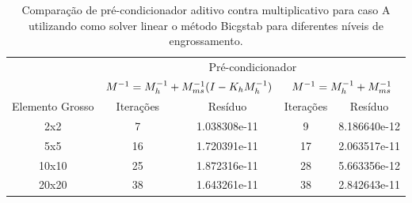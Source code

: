 \begin{table}[]
    \caption{Comparação de pré-condicionador aditivo contra multiplicativo para caso A utilizando como solver linear o método Bicgstab para diferentes níveis de engrossamento.}
    \label{table:precondcasoAcomp}
    \begin{tabular}{c|c|c|c|l|}

    \cline{2-5}
                                          & \multicolumn{4}{c|}{Pré-condicionador}                                                        \\ \cline{2-5} 
                                          & \multicolumn{2}{c|}{$M^{-1}=M^{-1}_{h} + M^{-1}_{ms}(I-K_hM^{-1}_{h})$}               & \multicolumn{2}{c|}{$M^{-1}=M^{-1}_{h} + M^{-1}_{ms}$}                \\ \hline
    \multicolumn{1}{|c|}{Elemento Grosso} & Iterações & \multicolumn{1}{c|}{Resíduo}      & Iterações & \multicolumn{1}{c|}{Resíduo}      \\ \hline
    \multicolumn{1}{|c|}{2x2}             & 7         & \multicolumn{1}{c|}{1.038308e-11} & 9         & \multicolumn{1}{c|}{8.186640e-12} \\ \hline
    \multicolumn{1}{|c|}{5x5}             & 16        & 1.720391e-11                      & 17        & 2.063517e-11                      \\ \hline
    \multicolumn{1}{|c|}{10x10}           & 25        & 1.872316e-11                      & 28        & 5.663356e-12                      \\ \hline
    \multicolumn{1}{|c|}{20x20}           & 38        & 1.643261e-11                      & 38        & 2.842643e-11                      \\ \hline
    \end{tabular}
\end{table}


